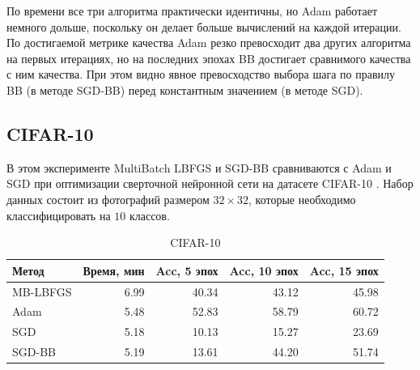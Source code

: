 \documentclass[preprint,12pt]{elsarticle}
\begin{document}
По времени все три алгоритма практически идентичны, но Adam работает немного дольше, поскольку он делает больше вычислений на каждой итерации. 
По достигаемой метрике качества Adam резко превосходит два других алгоритма на первых итерациях, но на последних эпохах BB достигает сравнимого качества с ним качества. 
При этом видно явное превосходство выбора шага по правилу BB (в методе SGD-BB) перед константным значением (в методе SGD).


\subsection{CIFAR-10}
В этом эксперименте MultiBatch LBFGS и SGD-BB сравниваются с Adam и SGD при оптимизации сверточной нейронной сети на датасете CIFAR-10 \cite{CIFAR10}. 
Набор данных состоит из фотографий размером $32 \times 32$, которые необходимо классифицировать на $10$ классов.
\begin{table}[h!]
\caption{CIFAR-10}
\centering
\begin{tabular}{lrrrr}
\toprule
Метод &  Время, мин &  Acc, 5 эпох &  Acc, 10 эпох &  Acc, 15 эпох \\
\midrule
    MB-LBFGS &  6.99 &  40.34 &   43.12 &   45.98 \\
     Adam &  5.48 &  52.83 &   58.79 &   60.72 \\
      SGD &  5.18 &  10.13 &   15.27 &   23.69 \\
       SGD-BB &  5.19 &  13.61 &   44.20 &   51.74 \\
\bottomrule
\end{tabular}
\end{table}
\end{document}
